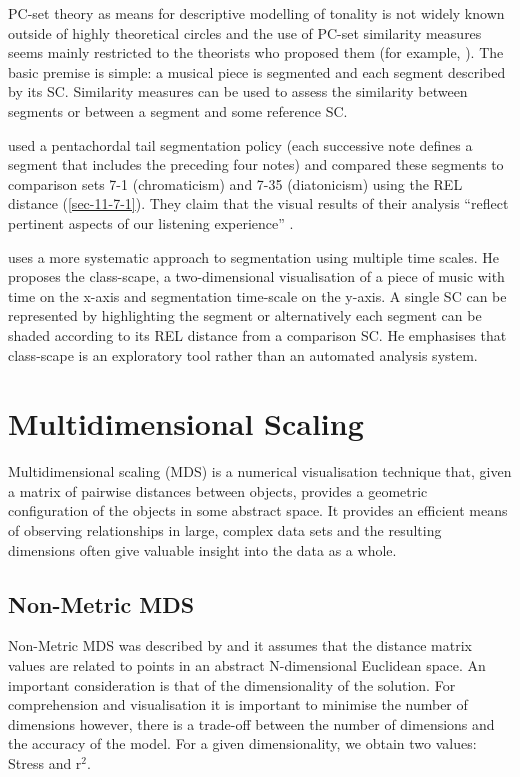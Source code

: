 \documentclass{article}
\begin{document}
PC-set theory as means for descriptive modelling of tonality is not
widely known outside of highly theoretical circles and the use of
PC-set similarity measures seems mainly restricted to the theorists
who proposed them (for example, \citealt{Isaacson1996}). The basic
premise is simple: a musical piece is segmented and each segment
described by its SC. Similarity measures can be used to assess the
similarity between segments or between a segment and some reference
SC.

\citet{Huovinen2007} used a pentachordal tail segmentation policy
(each successive note defines a segment that includes the preceding
four notes) and compared these segments to comparison sets 7-1
(chromaticism) and 7-35 (diatonicism) using the REL distance
(\ref{sec-11-7-1}). They claim that the visual results of their analysis ``reflect
pertinent aspects of our listening experience''
\citep[pp. 204]{Huovinen}.

\citet[chap. 5.3]{Martorell2013} uses a more systematic approach to
segmentation using multiple time scales. He proposes the class-scape,
a two-dimensional visualisation of a piece of music with time on the
x-axis and segmentation time-scale on the y-axis. A single SC can be
represented by highlighting the segment or alternatively each segment
can be shaded according to its REL distance from a comparison SC. He
emphasises that class-scape is an exploratory tool rather than an
automated analysis system.
\section{Multidimensional Scaling}
\label{sec-4}

Multidimensional scaling (MDS) is a numerical visualisation technique
that, given a matrix of pairwise distances between objects, provides a
geometric configuration of the objects in some abstract space. It
provides an efficient means of observing relationships in large,
complex data sets and the resulting dimensions often give valuable
insight into the data as a whole.
\subsection{Non-Metric MDS}
\label{sec-4-1}

Non-Metric MDS was described by \citet{Shepard1962} and it assumes
that the distance matrix values are related to points in an abstract
N-dimensional Euclidean space. An important consideration is that of
the dimensionality of the solution. For comprehension and
visualisation it is important to minimise the number of dimensions
however, there is a trade-off between the number of dimensions and the
accuracy of the model. For a given dimensionality, we obtain two
values: Stress and r$^2$.
\end{document}
